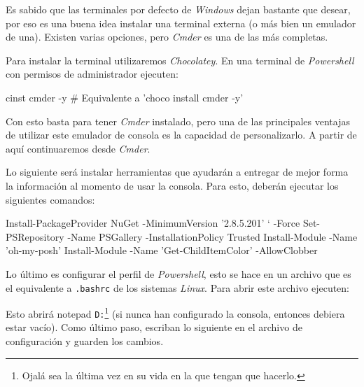   \begin{tcolorbox}[enhanced,breakable, colframe=SpringGreen!75!black, title=(Opcional) Cmder]
    Es sabido que las terminales por defecto de \textit{Windows} dejan bastante que desear, 
    por eso es una buena idea instalar una terminal externa (o más bien un emulador de una).
    Existen varias opciones, pero \textit{Cmder} es una de las más completas.
  
    Para instalar la terminal utilizaremos \textit{Chocolatey}.
    En una terminal de \textit{Powershell} con permisos de administrador ejecuten:
  
    \begin{powershell}
      cinst cmder -y # Equivalente a 'choco install cmder -y'
    \end{powershell}
  
    Con esto basta para tener \textit{Cmder} instalado, pero una de las principales ventajas
    de utilizar este emulador de consola es la capacidad de personalizarlo.
    A partir de aquí continuaremos desde \textit{Cmder}.
    
    Lo siguiente será instalar herramientas que ayudarán a entregar de mejor forma la información 
    al momento de usar la consola.
    Para esto, deberán ejecutar los siguientes comandos:
  
    \begin{powershell}
      Install-PackageProvider NuGet -MinimumVersion '2.8.5.201' `
        -Force
      Set-PSRepository -Name PSGallery -InstallationPolicy Trusted
      Install-Module -Name 'oh-my-posh'
      Install-Module -Name 'Get-ChildItemColor' -AllowClobber
    \end{powershell}
  
    Lo último es configurar el perfil de \textit{Powershell}, esto se hace en un archivo que
    es el equivalente a \texttt{.bashrc} de los sistemas \textit{Linux}.
    Para abrir este archivo ejecuten:
  
  
    Esto abrirá notepad \texttt{D:}\footnote{Ojalá sea la última vez en su vida en la que tengan que 
    hacerlo.} (si nunca han configurado la consola, entonces debiera estar vacío).
    Como último paso, escriban lo siguiente en el archivo de configuración y guarden los 
    cambios.
    

\end{tcolorbox}
